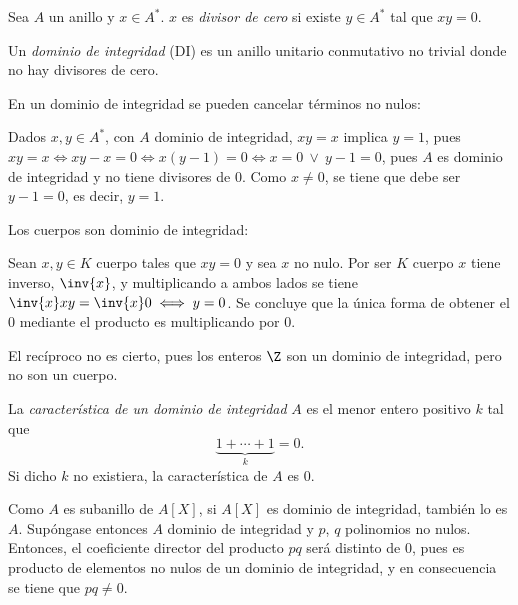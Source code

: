 \begin{deff}{\cite[p.~23]{GamboaAnillos}}
    Sea $A$ un anillo y $x\in A^*$. $x$ es \textit{divisor de cero} si existe $y \in A^*$ tal que $xy = 0$.
\end{deff}



\begin{deff}{\cite[p.~23]{GamboaAnillos}}
    Un \textit{dominio de integridad} (DI) es un anillo unitario conmutativo no trivial donde no hay divisores de cero.
\end{deff}

\begin{obss}
    \item En un dominio de integridad se pueden cancelar términos no nulos:
    
    Dados $x,y\in A^*$, con $A$ dominio de integridad, $xy=x$ implica $y=1$, pues $xy =x \iff xy - x = 0 \iff x(y-1) = 0 \iff x = 0 \ \lor\ y-1 = 0$, pues $A$ es dominio de integridad y no tiene divisores de 0. Como $x\neq0$, se tiene que debe ser $y-1 = 0$, es decir, $y = 1$.

    \item Los cuerpos son dominio de integridad:

    Sean $x,y\in K$ cuerpo tales que $xy = 0$ y sea $x$ no nulo. Por ser $K$ cuerpo $x$ tiene inverso, $\inv{x}$, y multiplicando a ambos lados se tiene $\inv{x}xy = \inv{x}0 \iff y = 0$. Se concluye que la única forma de obtener el 0 mediante el producto es multiplicando por 0.
    
    El recíproco no es cierto, pues los enteros $\Z$ son un dominio de integridad, pero no son un cuerpo.
\end{obss}

\begin{deff}{\cite[p.~39]{GamboaAnillos}}\label{caracteristica}
    La \textit{característica de un dominio de integridad} $A$ es el menor entero positivo $k$ tal que \[\underbrace{1 +  \cdots + 1}_{k} = 0.\]
    Si dicho $k$ no existiera, la característica de $A$ es $0$.
\end{deff}

\begin{prop}
\end{prop}

\begin{dem}{\cite[p.~118]{GamboaAnillos}}
Como $A$ es subanillo de $A[X]$, si $A[X]$ es dominio de integridad, también lo es $A$. Supóngase entonces $A$ dominio de integridad y $p$, $q$ polinomios no nulos. Entonces, el coeficiente director del producto $pq$ será distinto de 0, pues es producto de elementos no nulos de un dominio de integridad, y en consecuencia se tiene que $pq \neq 0$. 
\end{dem}

